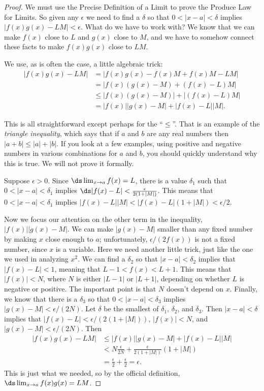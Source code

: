 \begin{proof}
We must use the Precise Definition of a Limit to prove the Produce Law for Limits.
So given any $\epsilon$ we need to find a $\delta$ so that $0<|x-a|<\delta$ implies
$|f(x)g(x)-LM|<\epsilon$. What do we have to work with? We know that we can make 
$f(x)$ close to $L$ and $g(x)$ close to $M$, and we have to somehow connect these
facts to make $f(x)g(x)$ close to $LM$.

We use, as is often the case, a little algebraic trick:
\begin{align*}
|f(x)g(x)-LM|&=|f(x)g(x)-f(x)M+f(x)M-LM|	\\
&=|f(x)(g(x)-M)+(f(x)-L)M|	\\
&\leq |f(x)(g(x)-M)|+|(f(x)-L)M|	\\
&=|f(x)||g(x)-M|+|f(x)-L||M|.
\end{align*}

This is all straightforward except perhaps for the ``$\leq$''. That is an example
of the \emph{triangle inequality}, which says that if $a$ and $b$ are any real numbers
then $|a+b|\leq|a|+|b|$. If you look at a few examples, using positive and negative numbers
in various combinations for $a$ and $b$, you should quickly understand why this is true.
We will not prove it formally.

Suppose $\epsilon>0$. Since $\ds\lim_{x\to a} f(x)=L$, there is a value $\delta_1$
such that $0<|x-a|<\delta_1$ implies $\ds|f(x)-L|<\frac{\epsilon}{2(1+|M|)}$.
This means that $0<|x-a|<\delta_1$ implies $|f(x)-L||M|<|f(x)-L|(1+|M|)<\epsilon/2$.

Now we focus our attention on the other term in the inequality, $|f(x)||g(x)-M|$.
We can make $|g(x)-M|$ smaller than any fixed number by making $x$
close enough to $a$; unfortunately, $\epsilon/(2f(x))$ is not a fixed
number, since $x$ is a variable. Here we need another little trick,
just like the one we used in analyzing $x^2$. We can find a $\delta_2$
so that $|x-a|<\delta_2$ implies that $|f(x)-L|<1$, meaning that $L-1
< f(x) < L+1$. This means that $|f(x)|<N$, where $N$ is either $|L-1|$
or $|L+1|$, depending on whether $L$ is negative or positive. The
important point is that $N$ doesn't depend on $x$. Finally, we know that
there is a $\delta_3$ so that $0<|x-a|<\delta_3$ implies
$|g(x)-M|<\epsilon/(2N)$. Let $\delta$ be the smallest of $\delta_1$, $\delta_2$, and
$\delta_3$. Then $|x-a|<\delta$ implies that
$|f(x)-L|<\epsilon/(2(1+|M|))$, $|f(x)|<N$, and
$|g(x)-M|<\epsilon/(2N)$. Then 
\begin{align*}
|f(x)g(x)-LM|&\leq |f(x)||g(x)-M|+|f(x)-L||M|	\\
&< N\frac{\epsilon}{2N}+\frac{\epsilon}{2(1+|M|)}(1+|M|)	\\
&=\frac{\epsilon}{2}+\frac{\epsilon}{2}=\epsilon.
\end{align*}
This is just what we needed, so by the official definition,
$\ds \lim_{x\to a}f(x)g(x)=LM$.
\end{proof} 



